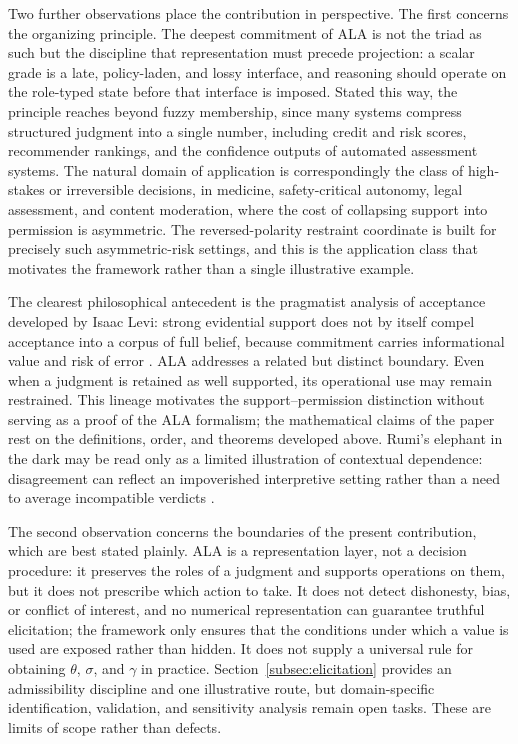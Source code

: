 \documentclass[reqno,final]{amsart}
\theoremstyle{definition}
\theoremstyle{plain}
\theoremstyle{remark}
\begin{document}
Two further observations place the contribution in perspective. The first concerns the organizing principle. The deepest commitment of ALA is not the triad as such but the discipline that representation must precede projection: a scalar grade is a late, policy-laden, and lossy interface, and reasoning should operate on the role-typed state before that interface is imposed. Stated this way, the principle reaches beyond fuzzy membership, since many systems compress structured judgment into a single number, including credit and risk scores, recommender rankings, and the confidence outputs of automated assessment systems. The natural domain of application is correspondingly the class of high-stakes or irreversible decisions, in medicine, safety-critical autonomy, legal assessment, and content moderation, where the cost of collapsing support into permission is asymmetric. The reversed-polarity restraint coordinate is built for precisely such asymmetric-risk settings, and this is the application class that motivates the framework rather than a single illustrative example.

The clearest philosophical antecedent is the pragmatist analysis of acceptance developed by Isaac Levi: strong evidential support does not by itself compel acceptance into a corpus of full belief, because commitment carries informational value and risk of error \cite{LeviGamblingTruth1967,LeviEnterprise1980}. ALA addresses a related but distinct boundary. Even when a judgment is retained as well supported, its operational use may remain restrained. This lineage motivates the support--permission distinction without serving as a proof of the ALA formalism; the mathematical claims of the paper rest on the definitions, order, and theorems developed above. Rumi's elephant in the dark may be read only as a limited illustration of contextual dependence: disagreement can reflect an impoverished interpretive setting rather than a need to average incompatible verdicts \cite{RumiMathnawi}.

The second observation concerns the boundaries of the present contribution, which are best stated plainly. ALA is a representation layer, not a decision procedure: it preserves the roles of a judgment and supports operations on them, but it does not prescribe which action to take. It does not detect dishonesty, bias, or conflict of interest, and no numerical representation can guarantee truthful elicitation; the framework only ensures that the conditions under which a value is used are exposed rather than hidden. It does not supply a universal rule for obtaining \(\theta\), \(\sigma\), and \(\gamma\) in practice. Section~\ref{subsec:elicitation} provides an admissibility discipline and one illustrative route, but domain-specific identification, validation, and sensitivity analysis remain open tasks. These are limits of scope rather than defects.
\end{document}
